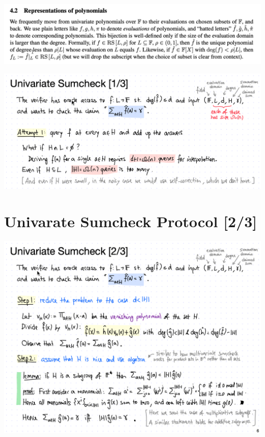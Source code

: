 \documentclass{beamer}
\begin{document}
\begin{frame}{}
	\begin{minipage}{0.42\linewidth}
		\includegraphics[scale=0.25]{t2.png}
	\end{minipage}
\end{frame}



\begin{frame}{}
\begin{minipage}{0.42\linewidth}
	\includegraphics[scale=0.25]{u1.png}
\end{minipage}
\end{frame}

\section{Univarate Sumcheck Protocol [2/3]}



\begin{frame}{}
	\begin{minipage}{0.42\linewidth}
		\includegraphics[scale=0.25]{u2.png}
	\end{minipage}
\end{frame}
\end{document}

